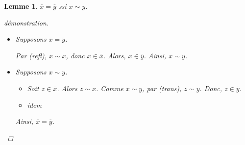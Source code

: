 \documentclass{report}
\newtheorem*{lem}{Lemme}
\theoremstyle{definition}
\theoremstyle{remark}
\begin{document}
	\begin{lem}
		$\overline{x} = \overline{y}$ ssi $x \sim y$.
		\begin{proof}[d\'emonstration]~

			\begin{itemize}
				\item[$(\Rightarrow)$] Supposons $\overline{x} = \overline{y}$.

				Par (refl), $x \sim x$, donc $x \in \overline{x}$. Alors, $x \in \overline{y}$. Ainsi, $x \sim y$.
				\item[$(\Leftarrow)$] Supposons $x \sim y$.
				\begin{itemize}
					\item[$(\subseteq)$] Soit $z \in \overline{x}$. Alors $z \sim x$. Comme $x \sim y$, par (trans), $z \sim y$. Donc, $z \in \overline{y}$.
					\item[$(\supseteq)$] idem
				\end{itemize}

				Ainsi, $\overline{x} = \overline{y}$.
			\end{itemize}
		\end{proof}
	\end{lem}
\end{document}
